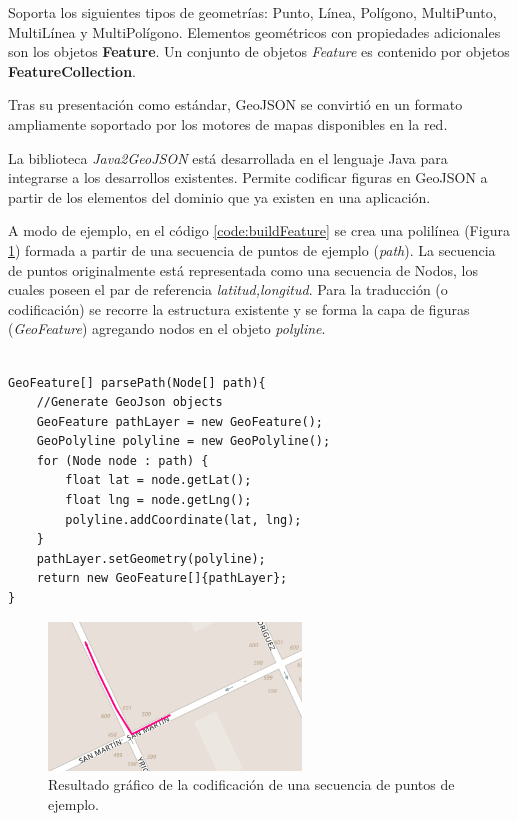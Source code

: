 Soporta los siguientes tipos de geometrías: Punto, Línea, Polígono, MultiPunto, MultiLínea y MultiPolígono. Elementos geométricos con propiedades adicionales son los objetos \textbf{Feature}. Un conjunto de objetos \textit{Feature} es contenido por objetos
\textbf{FeatureCollection}.

Tras su presentación como estándar, GeoJSON se convirtió en un formato ampliamente soportado por los motores de mapas disponibles en la red.

La biblioteca \textit{Java2GeoJSON} está desarrollada en el lenguaje Java para integrarse a los desarrollos existentes. Permite codificar figuras en GeoJSON a partir de los elementos del dominio que ya existen en una aplicación. 

A modo de ejemplo, en el código \ref{code:buildFeature} se crea una polilínea (Figura \ref{fig:polyline}) formada a partir de una secuencia de puntos de ejemplo (\textit{path}). La secuencia de puntos originalmente está representada como una secuencia de Nodos, los cuales poseen el par de referencia \textit{latitud,longitud}. Para la traducción (o codificación) se recorre la estructura existente y se forma la capa de figuras (\textit{GeoFeature}) agregando nodos en el objeto \textit{polyline}.

\begin{lstlisting}[caption={Código para la creación de una capa},captionpos=b,label={code:buildFeature},frame=single]  % Start your code-block

GeoFeature[] parsePath(Node[] path){
    //Generate GeoJson objects
    GeoFeature pathLayer = new GeoFeature();
    GeoPolyline polyline = new GeoPolyline();       
    for (Node node : path) {                        
        float lat = node.getLat();
        float lng = node.getLng();
        polyline.addCoordinate(lat, lng);                                   
    }
    pathLayer.setGeometry(polyline);
    return new GeoFeature[]{pathLayer};
}\end{lstlisting}


\begin{figure}[!ht]
  \centering
	\includegraphics[width=0.6\textwidth]{images/polyline.png}%
    \caption{\label{fig:polyline}Resultado gráfico de la codificación de una secuencia de puntos de ejemplo.}
\end{figure}

